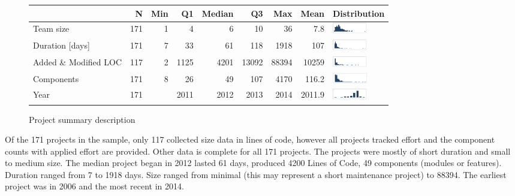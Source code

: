 \documentclass[smallcondensed]{svjour3}
\begin{document}
 \begin{figure}[ht]
\scriptsize
\centering
\begin{tabular}{lrrrrrrrl}
                                                                   & N   & Min & Q1   & Median & Q3    & Max   & Mean   &  Distribution \\\hline
Team size                                                          & 171 & 1   & 4    & 6      & 10    & 36    &  7.8    &  \includegraphics[width=15mm]{img/team_size.png} \\ 
Duration {[}days{]}                                                & 171 & 7   & 33   & 61     & 118   & 1918  & 107    & \includegraphics[width=15mm]{img/duration.png} \\
Added \& Modified LOC                                                 & 117 & 2   & 1125 & 4201   & 13092 & 88394 & 10259  & \includegraphics[width=15mm]{img/LOC.png} \\
Components                                                         & 171 & 8   & 26   & 49     & 107   & 4170  & 116.2  & \includegraphics[width=15mm]{img/components.png} \\
Year                                                               & 171 &     & 2011 & 2012   & 2013  & 2014  & 2011.9 & \includegraphics[width=15mm]{img/year.png}
\end{tabular}

\caption{Project summary description}
\label{fig:Project-descriptive-stats}
\end{figure}
 
 
 Of the 171 projects in the sample, only 117 collected size data in lines of code, however all projects tracked effort and  the component counts with applied effort are provided. Other data is complete for all 171 projects. The projects were mostly of short duration and small to medium size. The median project began in 2012 lasted 61 days, produced 4200 Lines of Code, 49 components (modules or features). Duration ranged from 7 to 1918 days. Size ranged from minimal (this may represent a short maintenance project) to 88394. The earliest project was in 2006 and the most recent in 2014. 
 
\end{document}

